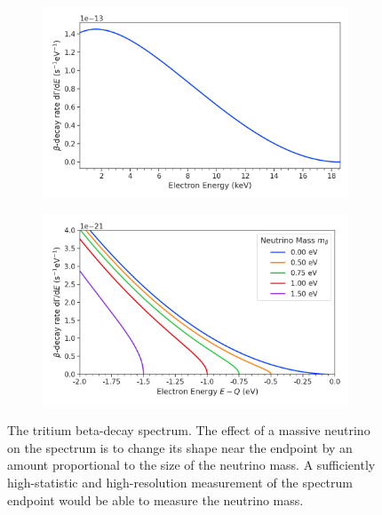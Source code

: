 \begin{figure}[htbp]
    \centering
    \begin{subfigure}{0.6\textwidth}
        \includegraphics[width=\textwidth]{figs/Chapter-2/230302_atomic_tritium_spectrum.png}
        \caption{}
    \end{subfigure}
    \begin{subfigure}{0.6\textwidth}
        \includegraphics*[width=\textwidth]{figs/Chapter-2/230302_atomic_tritium_spectrum_near_endpoint.png}
        \caption{}
    \end{subfigure}
    \caption{The tritium beta-decay spectrum. The effect of a massive neutrino on the spectrum is to change its shape near the endpoint by an amount proportional to the size of the neutrino mass. A sufficiently high-statistic and high-resolution measurement of the spectrum endpoint would be able to measure the neutrino mass.}
    \label{fig:chap2-atomic-tritium-endpoint}
\end{figure}


